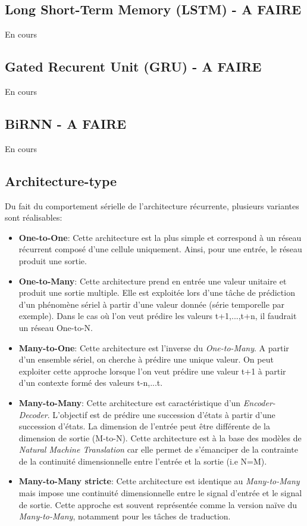 \subsection{Long Short-Term Memory (LSTM) - A FAIRE}
En cours
\subsection{Gated Recurent Unit (GRU) - A FAIRE}
En cours
\subsection{BiRNN - A FAIRE}
En cours
\subsection{Architecture-type}
Du fait du comportement sérielle de l'architecture récurrente, plusieurs variantes sont réalisables:\\

\begin{itemize}
    \item \textbf{One-to-One}: Cette architecture est la plus simple et correspond à un réseau récurrent composé d'une cellule uniquement. Ainsi, pour une entrée, le réseau produit une sortie.\\

    \item \textbf{One-to-Many}: Cette architecture prend en entrée une valeur unitaire et produit une sortie multiple. Elle est exploitée lors d'une tâche de prédiction d'un phénomène sériel à partir d'une valeur donnée (série temporelle par exemple). Dans le cas où l'on veut prédire les valeurs t+1,...,t+n, il faudrait un réseau One-to-N.\\

    \item \textbf{Many-to-One}: Cette architecture est l'inverse du \textit{One-to-Many}. A partir d'un ensemble sériel, on cherche à prédire une unique valeur. On peut exploiter cette approche lorsque l'on veut prédire une valeur t+1 à partir d'un contexte formé des valeurs t-n,...t.\\

    \item \textbf{Many-to-Many}: Cette architecture est caractéristique d'un \textit{Encoder-Decoder}. L'objectif est de prédire une succession d'états à partir d'une succession d'états. La dimension de l'entrée peut être différente de la dimension de sortie (M-to-N). Cette architecture est à la base des modèles de \textit{Natural Machine Translation} car elle permet de s'émanciper de la contrainte de la continuité dimensionnelle entre l'entrée et la sortie (i.e N=M).\\

    \item \textbf{Many-to-Many stricte}: Cette architecture est identique au \textit{Many-to-Many} mais impose une continuité dimensionnelle entre le signal d'entrée et le signal de sortie. Cette approche est souvent représentée comme la version naïve du \textit{Many-to-Many}, notamment pour les tâches de traduction.
\end{itemize}

